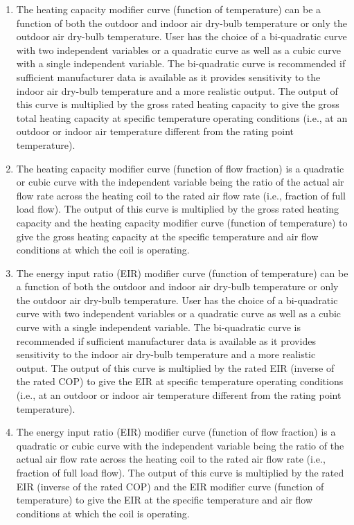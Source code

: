 \begin{enumerate}
\def\labelenumi{\arabic{enumi})}
\item
  The heating capacity modifier curve (function of temperature) can be a function of both the outdoor and indoor air dry-bulb temperature or only the outdoor air dry-bulb temperature. User has the choice of a bi-quadratic curve with two independent variables or a quadratic curve as well as a cubic curve with a single independent variable. The bi-quadratic curve is recommended if sufficient manufacturer data is available as it provides sensitivity to the indoor air dry-bulb temperature and a more realistic output. The output of this curve is multiplied by the gross rated heating capacity to give the gross total heating capacity at specific temperature operating conditions (i.e., at an outdoor or indoor air temperature different from the rating point temperature).
\item
  The heating capacity modifier curve (function of flow fraction) is a quadratic or cubic curve with the independent variable being the ratio of the actual air flow rate across the heating coil to the rated air flow rate (i.e., fraction of full load flow). The output of this curve is multiplied by the gross rated heating capacity and the heating capacity modifier curve (function of temperature) to give the gross heating capacity at the specific temperature and air flow conditions at which the coil is operating.
\item
  The energy input ratio (EIR) modifier curve (function of temperature) can be a function of both the outdoor and indoor air dry-bulb temperature or only the outdoor air dry-bulb temperature. User has the choice of a bi-quadratic curve with two independent variables or a quadratic curve as well as a cubic curve with a single independent variable. The bi-quadratic curve is recommended if sufficient manufacturer data is available as it provides sensitivity to the indoor air dry-bulb temperature and a more realistic output. The output of this curve is multiplied by the rated EIR (inverse of the rated COP) to give the EIR at specific temperature operating conditions (i.e., at an outdoor or indoor air temperature different from the rating point temperature).
\item
  The energy input ratio (EIR) modifier curve (function of flow fraction) is a quadratic or cubic curve with the independent variable being the ratio of the actual air flow rate across the heating coil to the rated air flow rate (i.e., fraction of full load flow). The output of this curve is multiplied by the rated EIR (inverse of the rated COP) and the EIR modifier curve (function of temperature) to give the EIR at the specific temperature and air flow conditions at which the coil is operating.

\end{enumerate}
